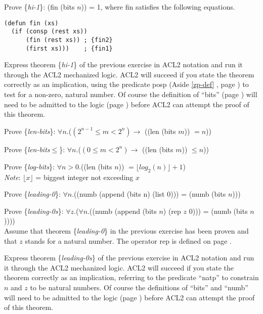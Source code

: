 \begin{ExerciseList}
\Exercise \label{hi-1} Prove \{\emph{hi-1}\}:
(fin (bits $n$)) = 1, where fin satisfies the following equations.
\label{fin-defun}
\begin{Verbatim}
(defun fin (xs)
  (if (consp (rest xs))
      (fin (rest xs)) ; {fin2}
      (first xs)))    ; {fin1}
\end{Verbatim}

\Exercise \label{hi-1-defthm} Express
theorem \{\emph{hi-1}\}
of the previous exercise in ACL2 notation
and run it through the ACL2 mechanized logic.
ACL2 will succeed if you state the theorem correctly as an implication,
using the predicate posp (Aside \ref{zp-def} , page \pageref{zp-def})
to test for a non-zero, natural number.
Of course the definition of ``bits'' (page \pageref{bits-defun})
will need to be admitted to the logic  (page \pageref{admit-def})
before ACL2 can attempt the proof of this theorem.

\Exercise \label{len-bits}
Prove \{\emph{len-bits}\}:
$\forall n$.($(2^{n-1} \le m < 2^n) \rightarrow$ ((len (bits $m$)) $= n$))

\Exercise \label{len-bitsLE}
Prove \{\emph{len-bits}$\le$\}:
$\forall n$.($(0 \le m < 2^n) \rightarrow$ ((len (bits $m$)) $\le n$))

\Exercise \label{log-bits}
Prove \{\emph{log-bits}\}:
$\forall n > 0$.((len (bits $n$)) $= \lfloor log_2(n) \rfloor + 1$) \\
\emph{Note}: $\lfloor x \rfloor$ = biggest integer not exceeding $x$

\Exercise \label{leading-0}
Prove \{\emph{leading-0}\}:
$\forall n$.((numb (append (bits n) (list 0))) = (numb (bits $n$)))

\Exercise \label{leading-0s}
Prove \{\emph{leading-0s}\}:
$\forall z$.($\forall n$.((numb (append (bits $n$) (rep $z$ 0))) = (numb (bits $n$)))) \\
Assume that theorem \{\emph{leading-0}\} in the previous exercise
has been proven and that $z$ stands for a natural number.
The operator rep is defined on page \pageref{rep-equations}.

\Exercise \label{leading-0s-defthm} Express theorem \{\emph{leading-0s}\}
of the previous exercise in ACL2 notation
and run it through the ACL2 mechanized logic.
ACL2 will succeed if you state the theorem correctly as an implication,
referring to the predicate ``natp'' to constrain $n$ and $z$ to be natural numbers.
Of course the definitions of ``bits'' and ``numb'' will need to
be admitted to the logic (page \pageref{bits-defun})
before ACL2 can attempt the proof of this theorem.


\end{ExerciseList}
